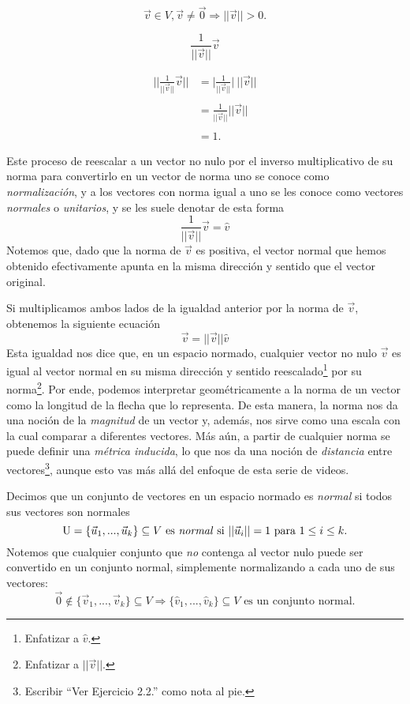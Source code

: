 \documentclass[12pt,dvipsnames]{article}
\numberwithin{equation}{section}
\begin{document}
\[
    \vec{v}\in V, \vec{v}\neq \vec{0} \Rightarrow ||\vec{v}||>0.
\] 

\[
\frac{1}{||\vec{v}||} \vec{v}
\] 

\begin{align*}
                \bigg|\bigg|\frac{1}{||\vec{v}||} \vec{v} \bigg|\bigg| &= \bigg| \frac{1}{||\vec{v}||} \bigg| \ ||\vec{v}|| \\ \\
                                                                       &= \frac{1}{||\vec{v}||} ||\vec{v}|| \\ \\
                                                                       &=1.
\end{align*}

\noindent Este proceso de reescalar a un vector no nulo por el inverso multiplicativo de su norma para convertirlo en un vector de norma uno se conoce como \emph{normalización}, y a los vectores con norma igual a uno se les conoce como vectores \emph{normales} o \emph{unitarios}, y se les suele denotar de esta forma
\[
    \frac{1}{||\vec{v}||} \vec{v} = \hat{v}
\] 
Notemos que, dado que la norma de $\vec{v}$ es positiva, el vector normal que hemos obtenido efectivamente apunta en la misma dirección y sentido que el vector original.

Si multiplicamos ambos lados de la igualdad anterior por la norma de $\vec{v}$, obtenemos la siguiente ecuación
\[
    \vec{v}= ||\vec{v}|| \hat{v}
\] 
Esta igualdad nos dice que, en un espacio normado, cualquier vector no nulo $\vec{v}$ es igual al vector normal en su misma dirección y sentido reescalado\footnote{Enfatizar a $\hat{v}$.} por su norma\footnote{Enfatizar a $||\vec{v}||$.}. Por ende, podemos interpretar geométricamente a la norma de un vector como la longitud de la flecha que lo representa. De esta manera, la norma nos da una noción de la \emph{magnitud} de un vector y, además, nos sirve como una escala con la cual comparar a diferentes vectores. Más aún, a partir de cualquier norma se puede definir una \emph{métrica inducida}, lo que nos da una noción de \emph{distancia} entre vectores\footnote{Escribir ``Ver Ejercicio 2.2.'' como nota al pie.}, aunque esto vas más allá del enfoque de esta serie de videos.

Decimos que un conjunto de vectores en un espacio normado es \emph{normal} si todos sus vectores son normales
\[
    \text{U}=\{\vec{u}_1,...,\vec{u}_k\}\subseteq V \ \text{es \emph{normal} si } ||\vec{u}_i|| = 1 \text{ para } 1\le i\le k.
\]
Notemos que cualquier conjunto que \emph{no} contenga al vector nulo puede ser convertido en un conjunto normal, simplemente normalizando a cada uno de sus vectores:
\[
\vec{0}\notin\{\vec{v}_1,...,\vec{v}_k\}\subseteq V \Rightarrow \{\hat{v}_1, ..., \hat{v}_k\}\subseteq V \text{ es un conjunto normal}.
\] 
\end{document}
